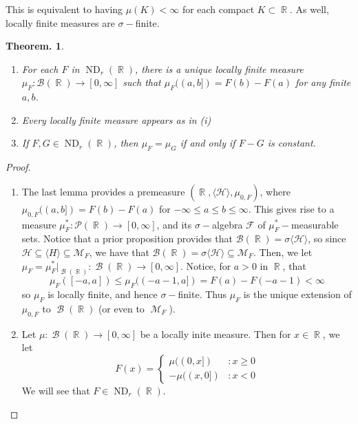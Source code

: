 \documentclass[11pt, a4paper]{memoir}
\DeclareMathOperator{\R}{{\mathbb{R}}}
\theoremstyle{change}
\newtheorem{theorem}{Theorem.}[section]
\theoremstyle{plain}
\theoremstyle{nonumberplain}
\newtheorem{proof}{Proof}
\DeclareMathOperator{\M}{{\mathcal{M}}}
\DeclareMathOperator{\B}{{\mathcal{B}}}
\DeclareMathOperator{\ND}{ND}
\begin{document}
This is equivalent to having $\mu(K)<\infty$ for each compact $K\subset\R$.
As well, locally finite measures are $\sigma-$finite.
\begin{theorem}
    \begin{enumerate}[nolistsep,label=(\roman*)]
        \item For each $F$ in $\ND_r(\R)$, there is a unique locally finite measure $\mu_F:\mathcal{B}(\R)\to[0,\infty]$ such that $\mu_F((a,b])=F(b)-F(a)$ for any finite $a,b$.
        \item Every locally finite measure appears as in (i)
        \item If $F,G\in\ND_r(\R)$, then $\mu_F=\mu_G$ if and only if $F-G$ is constant.
    \end{enumerate}
\end{theorem}
\begin{proof}
    \begin{enumerate}
        \item The last lemma provides a premeasure $(\R,\langle\mathcal{H}\rangle,\mu_{0,F})$, where $\mu_{0,F}((a,b])=F(b)-F(a)$ for $-\infty\leq a\leq b\leq\infty$. %
            This gives rise to a measure $\mu_F^*:\mathcal{P}(\R)\to[0,\infty]$, and its $\sigma-$algebra $\mathcal{F}$ of $\mu_F^*-$measurable sets.
            Notice that a prior proposition provides that $\mathcal{B}(\R)=\sigma\langle\mathcal{H}\rangle$, so since $\mathcal{H}\subseteq \langle H\rangle\subseteq\mathcal{M}_F$, we have that $\mathcal{B}(\R)=\sigma\langle\mathcal{H}\rangle\subseteq\mathcal{M}_F$.
            Then, we let $\mu_F=\mu^*_F|_{\B(\R)}:\B(\R)\to[0,\infty]$.
            Notice, for $a>0$ in $\R$, that
            \begin{equation*}
                \mu_F([-a,a])\leq \mu_F((-a-1,a])=F(a)-F(-a-1)<\infty
            \end{equation*}
            so $\mu_F$ is locally finite, and hence $\sigma-$finite.
            Thus $\mu_F$ is the unique extension of $\mu_{0,F}$ to $\B(\R)$ (or even to $\M_F$).
        \item Let $\mu:\B(\R)\to[0,\infty]$ be a locally inite measure.
            Then for $x\in\R$, we let
            \begin{equation*}
                F(x)=\begin{cases}\mu((0,x])&:x\geq 0\\-\mu((x,0])&:x<0\end{cases}
            \end{equation*}
            We will see that $F\in\ND_r(\R)$.

\end{enumerate}
\end{proof}
\end{document}
